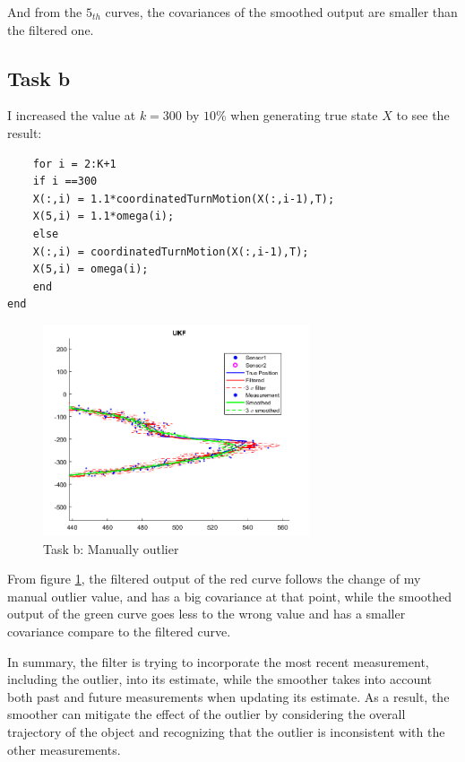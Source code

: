 And from the $ 5_{th} $ curves, the covariances of the smoothed output are smaller than the filtered one.

\subsection{Task b}

I increased the value at $k=300$  by $ 10\% $ when generating true state $ X $ to see the result:

\begin{lstlisting}
    for i = 2:K+1
    if i ==300
    X(:,i) = 1.1*coordinatedTurnMotion(X(:,i-1),T);
    X(5,i) = 1.1*omega(i);
    else
    X(:,i) = coordinatedTurnMotion(X(:,i-1),T);
    X(5,i) = omega(i);
    end
end
\end{lstlisting}

\begin{figure}[H]
 \centering
 \includegraphics[width=0.7\textwidth]{images/taskb.png}
 \caption{Task b: Manually outlier}
 \label{Taskb}
\end{figure}

From figure \ref{Taskb}, the filtered output of the red curve follows the change of my manual outlier value, and has a big covariance at that point, while the smoothed output of the green curve goes less to the wrong value and has a smaller covariance compare to the filtered curve.

In summary, the filter is trying to incorporate the most recent measurement, including the outlier, into its estimate, while the smoother takes into account both past and future measurements when updating its estimate. As a result, the smoother can mitigate the effect of the outlier by considering the overall trajectory of the object and recognizing that the outlier is inconsistent with the other measurements.